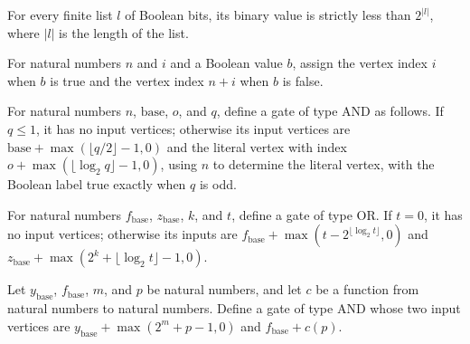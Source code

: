 \begin{theorem}
\label{BoolCircuit.Lupanov.ofBits_lt}
\leanok
{}
For every finite list $l$ of Boolean bits, its binary value is strictly less than
$2^{|l|}$, where $|l|$ is the length of the list.
\end{theorem}

\begin{definition}
\label{BoolCircuit.Lupanov.litV}
\leanok
For natural numbers $n$ and $i$ and a Boolean value $b$, assign the vertex index $i$
when $b$ is true and the vertex index $n+i$ when $b$ is false.
\end{definition}

\begin{definition}
\label{BoolCircuit.Lupanov.heapGate}
\leanok
{}
For natural numbers $n$, $\mathrm{base}$, $o$, and $q$, define a gate of type AND as
follows. If $q\le 1$, it has no input vertices; otherwise its input vertices are
$\mathrm{base}+\max(\lfloor q/2\rfloor-1,0)$ and the literal vertex with index
$o+\max(\lfloor\log_2 q\rfloor-1,0)$, using $n$ to determine the literal vertex, with
the Boolean label true exactly when $q$ is odd.
\end{definition}

\begin{definition}
\label{BoolCircuit.Lupanov.funcGate}
\leanok
{}
For natural numbers $f_{\mathrm{base}}$, $z_{\mathrm{base}}$, $k$, and $t$, define a
gate of type OR. If $t=0$, it has no input vertices; otherwise its inputs are
$f_{\mathrm{base}}+\max(t-2^{\lfloor\log_2 t\rfloor},0)$ and
$z_{\mathrm{base}}+\max(2^k+\lfloor\log_2 t\rfloor-1,0)$.
\end{definition}

\begin{definition}
\label{BoolCircuit.Lupanov.combGate}
\leanok
{}
Let $y_{\mathrm{base}}$, $f_{\mathrm{base}}$, $m$, and $p$ be natural numbers, and let
$c$ be a function from natural numbers to natural numbers. Define a gate of type AND
whose two input vertices are $y_{\mathrm{base}}+\max(2^m+p-1,0)$ and
$f_{\mathrm{base}}+c(p)$.
\end{definition}

